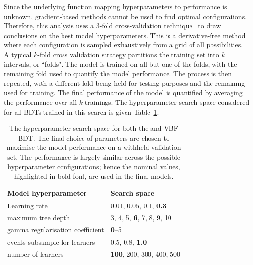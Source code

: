 Since the underlying function mapping hyperparameters to performance is unknown, gradient-based methods cannot be used to find optimal configurations. 
Therefore, this analysis uses a 3-fold cross-validation technique~\cite{patternRecognitionAndML} to draw conclusions on the best model hyperparameters. This is a derivative-free method where each configuration is sampled exhaustively from a grid of all possibilities. A typical $k$-fold cross validation strategy partitions the training set into $k$ intervals, or ``folds".
The model is trained on all but one of the folds, with the remaining fold used to quantify the model performance. The process is then repeated, with a different fold being held for testing purposes and the remaining used for training. The final performance of the model is quantified by averaging the performance over all $k$ trainings. The hyperparameter search space considered for all BDTs trained in this search is given Table~\ref{tab:bdt_hps}.
\begin{table}[htbp!]
\centering
\caption[The hyperparameter search space for the BDTs used in the categorisation of \Hee events]{The hyperparameter search space for both the \ggH and VBF BDT. The final choice of parameters are chosen to maximise the model performance on a withheld validation set. The performance is largely similar across the possible hyperparameter configurations; hence the nominal values, highlighted in bold font, are used in the final models. 
}
\label{tab:bdt_hps}
\begin{tabular}{l|l}
\hline
Model hyperparameter    & Search space \\ \hline 
Learning rate & 0.01, 0.05, 0.1, \textbf{0.3}       \\
maximum tree depth & 3, 4, 5, \textbf{6}, 7, 8, 9, 10\\
gamma regularisation coefficient & \textbf{0}--5 \\
events subsample for learners & 0.5, 0.8, \textbf{1.0} \\
number of learners & \textbf{100}, 200, 300, 400, 500 \\ 
\hline
\end{tabular}                  
\end{table}  

